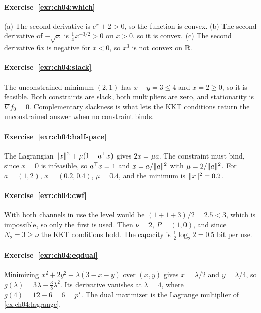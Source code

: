 
\paragraph{Exercise~\ref{exr:ch04:which}}
(a) The second derivative is $e^x+2>0$, so the function is convex. (b) The second derivative of $-\sqrt x$ is $\frac14x^{-3/2}>0$ on $x>0$, so it is convex. (c) The second derivative $6x$ is negative for $x<0$, so $x^3$ is not convex on $\mathbb{R}$.

\paragraph{Exercise~\ref{exr:ch04:slack}}
The unconstrained minimum $(2,1)$ has $x+y=3\le4$ and $x=2\ge0$, so it is feasible. Both constraints are slack, both multipliers are zero, and stationarity is $\nabla f_0=0$. Complementary slackness is what lets the KKT conditions return the unconstrained answer when no constraint binds.

\paragraph{Exercise~\ref{exr:ch04:halfspace}}
The Lagrangian $\lVert x\rVert^2+\mu(1-a^{\top} x)$ gives $2x=\mu a$. The constraint must bind, since $x=0$ is infeasible, so $a^{\top} x=1$ and $x=a/\lVert a\rVert^2$ with $\mu=2/\lVert a\rVert^2$. For $a=(1,2)$, $x=(0.2,0.4)$, $\mu=0.4$, and the minimum is $\lVert x\rVert^2=0.2$.

\paragraph{Exercise~\ref{exr:ch04:cwf}}
With both channels in use the level would be $(1+1+3)/2=2.5<3$, which is impossible, so only the first is used. Then $\nu=2$, $P=(1,0)$, and since $N_2=3\ge\nu$ the KKT conditions hold. The capacity is $\frac12\log_2 2=0.5$ bit per use.

\paragraph{Exercise~\ref{exr:ch04:eqdual}}
Minimizing $x^2+2y^2+\lambda(3-x-y)$ over $(x,y)$ gives $x=\lambda/2$ and $y=\lambda/4$, so $g(\lambda)=3\lambda-\frac38\lambda^2$. Its derivative vanishes at $\lambda=4$, where $g(4)=12-6=6=p^\star$. The dual maximizer is the Lagrange multiplier of \cref{ex:ch04:lagrange}.

